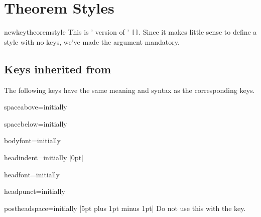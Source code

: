 \documentclass{ltxdoc}
\newcommand{\bracks}[1]{\texttt{[#1]}}
\newcommand{\ttbraces}[1]{\braces{\texttt{#1}}}
\begin{document}
\section{Theorem Styles}

\begin{docCommand}{newkeytheoremstyle}{}
This is ' version of ' \bracks{}. Since it makes little sense to define a style with no keys, we've made the  argument mandatory.
\end{docCommand}

\subsection{Keys inherited from }

The following keys have the same meaning and syntax as the corresponding  keys.

\begin{docKey}{spaceabove}{=}{initially }

\end{docKey}

\begin{docKey}{spacebelow}{=}{initially }

\end{docKey}

\begin{docKey}{bodyfont}{=}{initially }

\end{docKey}

\begin{docKey}{headindent}{=}{initially |0pt|}

\end{docKey}

\begin{docKey}{headfont}{=}{initially }

\end{docKey}

\begin{docKey}{headpunct}{=}{initially \ttbraces{.}}

\end{docKey}

\begin{docKey}{postheadspace}{=}{initially |5pt plus 1pt minus 1pt|}
Do not use this with the  key.
\end{docKey}
\end{document}
